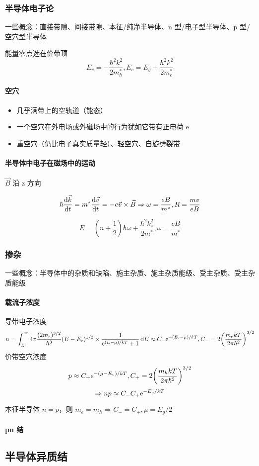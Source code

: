 \subsubsection{半导体电子论}

一些概念：直接带隙、间接带隙、本征/纯净半导体、n 型/电子型半导体、p 型/空穴型半导体

能量零点选在价带顶
\[ E_v = - \frac{\hbar^2 k^2}{2 m_h^*}, E_c = E_g + \frac{\hbar^2 k^2}{2 m_e^*} \]

\paragraph{空穴}

\begin{itemize}
    \item 几乎满带上的空轨道（能态）
    \item 一个空穴在外电场或外磁场中的行为犹如它带有正电荷 e
    \item 重空穴（仍比电子真实质量轻）、轻空穴、自旋劈裂带
\end{itemize}

\paragraph{半导体中电子在磁场中的运动}

$ \vec{B} $ 沿 z 方向

\[ \hbar \dv{\vec{k}}{t} = m^* \dv{\vec{v}}{t} = - e \vec{v} \times \vec{B} \Rightarrow \omega = \frac{e B}{m^*}, R = \frac{m v}{e B} \]

\[ E = (n + \frac{1}{2}) \hbar \omega + \frac{\hbar^2 k_z^2}{2 m^*}, \omega = \frac{e B}{m^*} \]

\subsubsection{掺杂}

一些概念：半导体中的杂质和缺陷、施主杂质、施主杂质能级、受主杂质、受主杂质能级

\paragraph{载流子浓度}

导带电子浓度
\[ n = \int_{E_c}^{\infty} 4 \pi \frac{(2 m_e)^{3/2}}{h^3} (E - E_c)^{1/2} \times \frac{1}{\mathrm{e}^{(E - \mu) / k T} + 1} \dd{E} \approx C_- \mathrm{e}^{- (E_c - \mu) / k T}, C_- = 2 \qty(\frac{m_e k T}{2 \pi \hbar^2})^{3/2} \]
价带空穴浓度
\[ p \approx C_+ \mathrm{e}^{- (\mu - E_v) / k T}, C_+ = 2 \qty(\frac{m_h k T}{2 \pi \hbar^2})^{3/2} \]
\[ \Rightarrow n p \approx C_- C_+ \mathrm{e}^{- E_g / k T} \]

本征半导体 $ n = p $，则 $ m_e = m_h \Rightarrow C_- = C_+, \mu = E_g / 2 $

\paragraph{pn 结}

{\color{gray}
    \subsection{半导体异质结}
}
